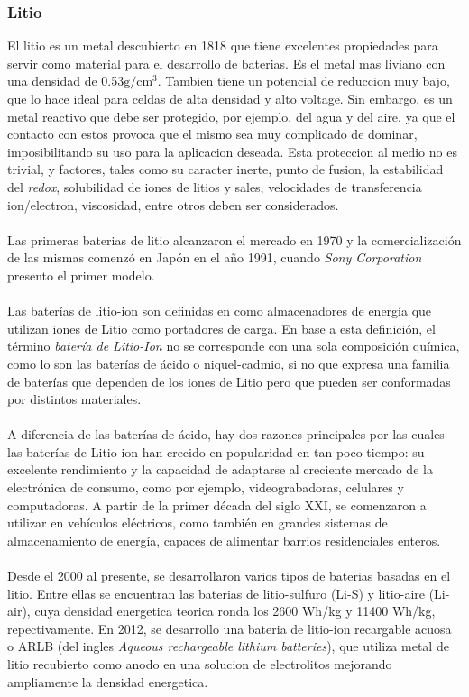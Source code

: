 \documentclass[10pt,a4paper]{article}
\begin{document}
    \subsubsection{Litio}

    El litio es un metal descubierto en 1818 que tiene excelentes 
    propiedades para servir como material para el desarrollo de baterias. 
    Es el metal mas liviano con una densidad de 0.53$\mathrm{g/cm^3}$. 
    Tambien tiene un potencial de reduccion muy bajo, que lo hace ideal para 
    celdas de alta densidad y alto voltage. Sin embargo, es un metal 
    reactivo que debe ser protegido, por ejemplo, del agua y del aire, 
    ya que el contacto con estos provoca que el mismo sea muy complicado de 
    dominar, imposibilitando su uso para la aplicacion deseada. 
    Esta proteccion al medio no es trivial, y factores, tales como 
    su caracter inerte, punto de fusion, la estabilidad del \emph{redox}, 
    solubilidad de iones de litios y sales, velocidades de transferencia 
    ion/electron, viscosidad, entre otros deben ser considerados.\\
    \\
    \noindent Las primeras baterias de litio alcanzaron el mercado en 1970 y la 
    comercialización de las mismas comenzó en Japón en el año
    1991, cuando \emph{Sony Corporation} presento el primer modelo.\\
    \\
	\noindent Las baterías de litio-ion son definidas en \cite{def_liion} como 
    almacenadores de energía que utilizan iones de Litio como portadores de 
    carga. En base a esta definición, el término \emph{batería de Litio-Ion} no 
    se corresponde con una sola composición química, como lo son las baterías 
    de ácido o niquel-cadmio, si no que expresa una familia de baterías que 
    dependen de los iones de Litio pero que pueden ser conformadas por 
    distintos materiales.\\
    \\
    \noindent A diferencia de las baterías de ácido, hay dos razones principales por las 
    cuales las baterías de Litio-ion han crecido en popularidad en tan poco 
    tiempo: su excelente rendimiento y la capacidad de adaptarse al creciente 
    mercado de la electrónica de consumo, como por ejemplo, videograbadoras, 
    celulares y computadoras. A partir de la primer década del siglo XXI, se 
    comenzaron a utilizar en vehículos eléctricos, como también en grandes 
    sistemas de almacenamiento de energía, capaces de alimentar barrios 
    residenciales enteros.\\
    \\
    \noindentDesde Desde el 2000 al presente, se desarrollaron varios
    tipos de baterias basadas en el litio. Entre ellas se encuentran las
    baterias de litio-sulfuro (Li-S) y litio-aire (Li-air), cuya densidad
    energetica teorica ronda los 2600 Wh/kg y 11400 Wh/kg, repectivamente. En
    2012, se desarrollo una bateria de litio-ion recargable acuosa o ARLB (del
    ingles \emph{Aqueous rechargeable lithium batteries}), 
    que utiliza metal de litio recubierto como anodo en una solucion de 
    electrolitos mejorando ampliamente la densidad energetica.
\end{document}
